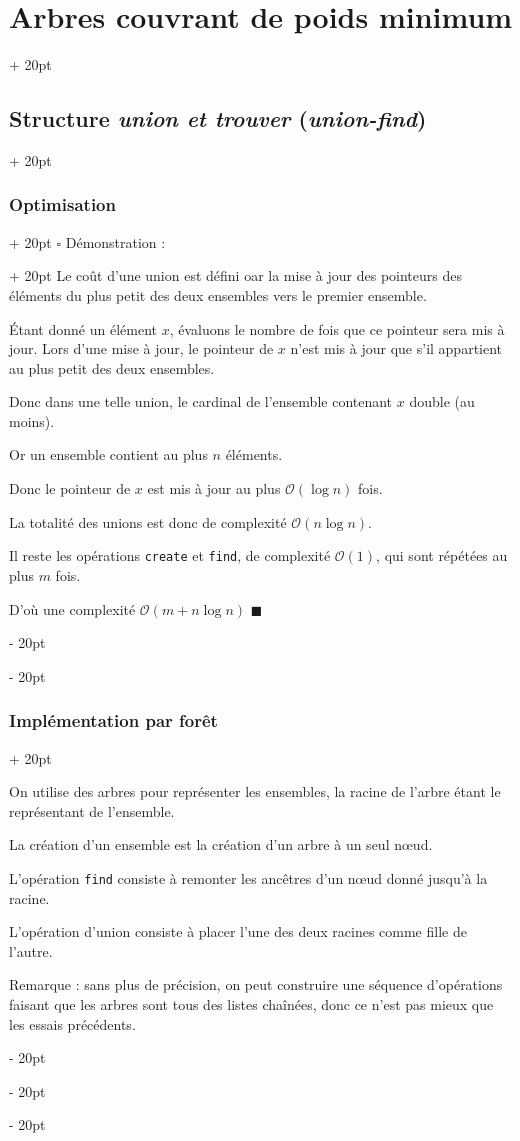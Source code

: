 \documentclass[a4paper, 12pt, twoside]{article}
\newcommand{\ind}[1][20pt]{\advance\leftskip + #1}
\newcommand{\deind}[1][20pt]{\advance\leftskip - #1}
\newenvironment{indt}[2][20pt]{#2 \par \ind[#1]}{\par \deind} %
\newenvironment{proof}[1][{Démonstration :}]{\begin{indt}{$\square$ #1}}{$\blacksquare$ \end{indt}}
\begin{document}
\begin{indt}{\section{Arbres couvrant de poids minimum}}
\begin{indt}{\subsection{Structure \textit{union et trouver} (\textit{union-find})}}
\begin{indt}{\subsubsection{Optimisation}}
\begin{proof}
                    Le coût d'une union est défini oar la mise à jour des pointeurs des éléments du plus petit des deux ensembles vers le premier ensemble.

                    \'Etant donné un élément $x$, évaluons le nombre de fois que ce pointeur sera mis à jour.
                    Lors d'une mise à jour, le pointeur de $x$ n'est mis à jour que s'il appartient au plus petit des deux ensembles.

                    Donc dans une telle union, le cardinal de l'ensemble contenant $x$ double (au moins).

                    Or un ensemble contient au plus $n$ éléments.

                    Donc le pointeur de $x$ est mis à jour au plus $\mathcal O(\log n)$ fois.

                    La totalité des unions est donc de complexité $\mathcal O(n\log n)$.

                    Il reste les opérations \texttt{create} et \texttt{find}, de complexité $\mathcal O(1)$, qui sont répétées au plus $m$ fois.

                    D'où une complexité $\mathcal O(m + n\log n)$
                \end{proof}
            \end{indt}

            \vspace{12pt}
            
            \begin{indt}{\subsubsection{Implémentation par forêt}}
                \label{2.2.5}

                On utilise des arbres pour représenter les ensembles, la racine de l'arbre étant le représentant de l'ensemble.

                La création d'un ensemble est la création d'un arbre à un seul n\oe ud.

                L'opération \texttt{find} consiste à remonter les ancêtres d'un n\oe ud donné jusqu'à la racine.

                L'opération d'union consiste à placer l'une des deux racines comme fille de l'autre.

                Remarque : sans plus de précision, on peut construire une séquence d'opérations faisant que les arbres sont tous des listes chaînées, donc ce n'est pas mieux que les essais précédents.


\end{indt}
\end{indt}
\end{indt}
\end{document}

